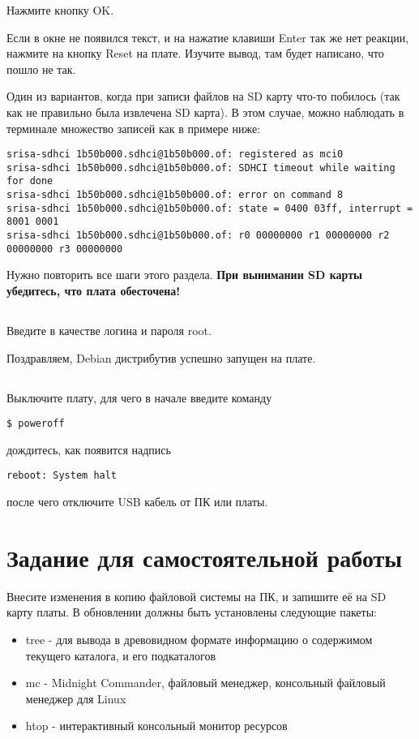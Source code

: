 Нажмите кнопку OK.

Если в окне не появился текст, и на нажатие клавиши Enter так же нет реакции,  нажмите на кнопку Reset на плате. Изучите вывод, там будет написано, что пошло не так.

Один из вариантов, когда при записи файлов на SD карту что-то побилось (так как не правильно была извлечена SD карта). В этом случае, можно наблюдать в терминале множество записей как в примере ниже:
\begin{lstlisting}[style=stdout]
srisa-sdhci 1b50b000.sdhci@1b50b000.of: registered as mci0
srisa-sdhci 1b50b000.sdhci@1b50b000.of: SDHCI timeout while waiting for done
srisa-sdhci 1b50b000.sdhci@1b50b000.of: error on command 8
srisa-sdhci 1b50b000.sdhci@1b50b000.of: state = 0400 03ff, interrupt = 8001 0001
srisa-sdhci 1b50b000.sdhci@1b50b000.of: r0 00000000 r1 00000000 r2 00000000 r3 00000000
\end{lstlisting}

Нужно повторить все шаги этого раздела. \textbf{При вынимании SD карты убедитесь, что плата обесточена!}

\subsection{} Введите в качестве логина и пароля root.

Поздравляем, Debian дистрибутив успешно запущен на плате.

\subsection{} Выключите плату, для чего в начале введите команду
\begin{lstlisting}[style=bash]
$ poweroff
\end{lstlisting}
дождитесь, как появится надпись
\begin{lstlisting}[style=stdout]
reboot: System halt
\end{lstlisting}
после чего отключите USB кабель от ПК или платы. 

\section{Задание для самостоятельной работы}

Внесите изменения в копию файловой системы на ПК, и запишите её на SD карту платы. В обновлении должны быть установлены следующие пакеты:
\begin{itemize}
	\item tree - для вывода в древовидном формате информацию о содержимом текущего каталога, и его подкаталогов
	
	\item mc - Midnight Commander, файловый менеджер, консольный файловый менеджер для Linux
	
	\item htop - интерактивный консольный монитор ресурсов
\end{itemize}
 
